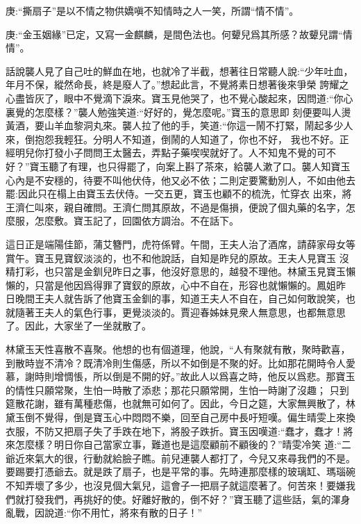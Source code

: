 

\begin{parag}
    \begin{note}庚:“撕扇子”是以不情之物供嬌嗔不知情時之人一笑，所謂“情不情”。\end{note}
\end{parag}


\begin{parag}
    \begin{note}庚:“金玉姻緣”已定，又寫一金麒麟，是間色法也。何顰兒爲其所感？故顰兒謂“情情”。\end{note}
\end{parag}


\begin{parag}
    話說襲人見了自己吐的鮮血在地，也就冷了半截，想著往日常聽人說:“少年吐血，年月不保，縱然命長，終是廢人了。”想起此言，不覺將素日想著後來爭榮 誇耀之心盡皆灰了，眼中不覺滴下淚來。寶玉見他哭了，也不覺心酸起來，因問道:“你心裏覺的怎麼樣？”襲人勉強笑道:“好好的，覺怎麼呢。”寶玉的意思即 刻便要叫人燙黃酒，要山羊血黎洞丸來。襲人拉了他的手，笑道:“你這一鬧不打緊，鬧起多少人來，倒抱怨我輕狂。分明人不知道，倒鬧的人知道了，你也不好， 我也不好。正經明兒你打發小子問問王太醫去，弄點子藥喫喫就好了。人不知鬼不覺的可不好？”寶玉聽了有理，也只得罷了，向案上斟了茶來，給襲人漱了口。襲人知寶玉心內是不安穩的，待要不叫他伏侍，他又必不依；二則定要驚動別人，不如由他去罷:因此只在榻上由寶玉去伏侍。一交五更，寶玉也顧不的梳洗，忙穿衣 出來，將王濟仁叫來，親自確問。王濟仁問其原故，不過是傷損，便說了個丸藥的名字，怎麼服，怎麼敷。寶玉記了，回園依方調治。不在話下。
\end{parag}


\begin{parag}
    這日正是端陽佳節，蒲艾簪門，虎符係臂。午間，王夫人治了酒席，請薛家母女等賞午。寶玉見寶釵淡淡的，也不和他說話，自知是昨兒的原故。王夫人見寶玉 沒精打彩，也只當是金釧兒昨日之事，他沒好意思的，越發不理他。林黛玉見寶玉懶懶的，只當是他因爲得罪了寶釵的原故，心中不自在，形容也就懶懶的。鳳姐昨 日晚間王夫人就告訴了他寶玉金釧的事，知道王夫人不自在，自己如何敢說笑，也就隨著王夫人的氣色行事，更覺淡淡的。賈迎春姊妹見衆人無意思，也都無意思了。因此，大家坐了一坐就散了。
\end{parag}


\begin{parag}
    林黛玉天性喜散不喜聚。他想的也有個道理，他說，“人有聚就有散，聚時歡喜，到散時豈不清冷？既清冷則生傷感，所以不如倒是不聚的好。比如那花開時令人愛慕，謝時則增惆悵，所以倒是不開的好。”故此人以爲喜之時，他反以爲悲。那寶玉的情性只願常聚，生怕一時散了添悲；那花只願常開，生怕一時謝了沒趣； 只到筵散花謝，雖有萬種悲傷，也就無可如何了。因此，今日之筵，大家無興散了，林黛玉倒不覺得，倒是寶玉心中悶悶不樂，回至自己房中長吁短嘆。偏生晴雯上來換衣服，不防又把扇子失了手跌在地下，將股子跌折。寶玉因嘆道:“蠢才，蠢才！將來怎麼樣？明日你自己當家立事，難道也是這麼顧前不顧後的？”晴雯冷笑 道:“二爺近來氣大的很，行動就給臉子瞧。前兒連襲人都打了，今兒又來尋我們的不是。要踢要打憑爺去。就是跌了扇子，也是平常的事。先時連那麼樣的玻璃缸、瑪瑙碗不知弄壞了多少，也沒見個大氣兒，這會子一把扇子就這麼著了。何苦來！要嫌我們就打發我們，再挑好的使。好離好散的，倒不好？”寶玉聽了這些話，氣的渾身亂戰，因說道:“你不用忙，將來有散的日子！”
\end{parag}


